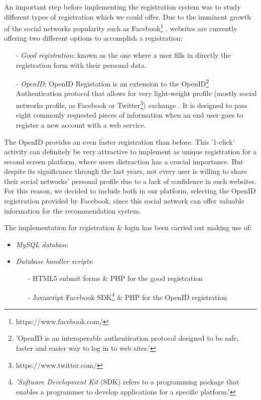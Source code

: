 \documentclass{acm_proc_article-sp}
\begin{document}
An important step before implementing the registration system was to study different types of registration which we could offer. Due to the imminent growth of the social networks popularity such as Facebook\footnote{https://www.facebook.com/} \cite{shih2009facebook}, websites are currently offering two different options to accomplish a registration:

\begin{itemize}
  	\item [-]\textit{Good registration}: known as the one where a user fills in directly the registration form with their personal data. 
	\item [-]\textit{OpenID}: OpenID Registation is an extension to the OpenID\cite{w3c:openid}\footnote{'OpenID is an interoperable authentication protocol designed to be safe, faster and easier way to log in to web sites.'} Authentication protocol that allows for very light-weight profile (mostly social networks profile, as Facebook or Twitter\footnote{https://www.twitter.com/}) exchange . It is designed to pass eight commonly requested pieces of information when an end user goes to register a new account with a web service. 
\end{itemize}

The OpenID provides an even faster registration than before. This '1-click' activity can definitely be very attractive to implement as unique registration for a second screen platform\cite{allen2012smashing}, where users distraction has a crucial importance. But despite its significance through the last years, not every user is willing to share their social networks' personal profile due to a lack of confidence in such websites\cite{pu2006trust}. For this reason, we decided to include both in our platform, selecting the OpenID registration provided by Facebook, since this social network can offer valuable information for the recommendation system. 


The implementation for registration \& login has been carried out making use of:

\begin{itemize}
  	\item \textit{MySQL database}
	\item \textit{Database handler scripts}: 
	\begin{itemize}
  		\item [-]HTML5 submit forms \& PHP for the good registration 
		\item [-]Javascript Facebook SDK\cite{web:sdk}\footnote{\textit{'Software Development Kit} (SDK) refers to a programming package that enables a programmer to develop applications for a specific platform.'} \& PHP for the OpenID registration 
	\end{itemize}
\end{itemize}
\end{document}
